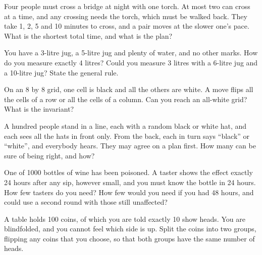 \begin{question}\label{iq:iv1:logic-riddles:11}
Four people must cross a bridge at night with one torch. At most two can cross at a time, and any crossing needs the torch, which must be walked back. They take 1, 2, 5 and 10 minutes to cross, and a pair moves at the slower one's pace. What is the shortest total time, and what is the plan?
\end{question}

\begin{question}\label{iq:iv1:logic-riddles:12}
You have a 3-litre jug, a 5-litre jug and plenty of water, and no other marks. How do you measure exactly 4 litres? Could you measure 3 litres with a 6-litre jug and a 10-litre jug? State the general rule.
\end{question}

\begin{question}\label{iq:iv1:logic-riddles:13}
On an 8 by 8 grid, one cell is black and all the others are white. A move flips all the cells of a row or all the cells of a column. Can you reach an all-white grid? What is the invariant?
\end{question}

\begin{question}\label{iq:iv1:logic-riddles:14}
A hundred people stand in a line, each with a random black or white hat, and each sees all the hats in front only. From the back, each in turn says ``black'' or ``white'', and everybody hears. They may agree on a plan first. How many can be sure of being right, and how?
\end{question}

\begin{question}\label{iq:iv1:logic-riddles:15}
One of 1000 bottles of wine has been poisoned. A taster shows the effect exactly 24 hours after any sip, however small, and you must know the bottle in 24 hours. How few tasters do you need? How few would you need if you had 48 hours, and could use a second round with those still unaffected?
\end{question}

\begin{question}\label{iq:iv1:logic-riddles:16}
A table holds 100 coins, of which you are told exactly 10 show heads. You are blindfolded, and you cannot feel which side is up. Split the coins into two groups, flipping any coins that you choose, so that both groups have the same number of heads.
\end{question}

